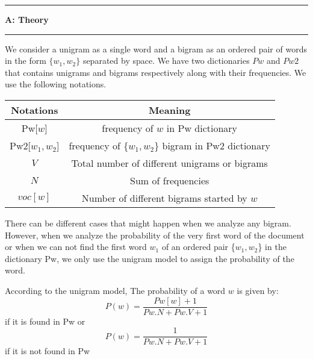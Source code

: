 \documentclass[11pt]{article}
\newcommand\question[2]{\vspace{.25in}\hrule\textbf{#1: #2}\vspace{.5em}\hrule\vspace{.10in}}
\begin{document}
\newcommand\NAME{Turash and Luiz}  %
\newcommand\ID{tmosharr \& lperesde}     %
\newcommand\HWNUM{}              %




\question{A}{Theory} 
We consider a unigram as a single word and a bigram as an ordered pair of words in the form $\{w_1,w_2\}$ separated by space.  We have two dictionaries $Pw$ and $Pw2$ that contains unigrams and bigrams respectively along with their frequencies. We use the following notations. 
\begin{table}[h]
	\vspace{-4pt}
	\centering
	\renewcommand\arraystretch{1.25}
	\begin{tabular}{|c|c|}
		\hline
		Notations   & Meaning  \\
		\hline
		Pw[$w$] & frequency of $w$ in Pw dictionary    \\
		\hline
		Pw2[$w_1,w_2$] & frequency of \{$w_1,w_2$\} bigram in Pw2 dictionary    \\
		\hline
		$V$ & Total number of different unigrams or bigrams  \\
		\hline
		$N$ & Sum of frequencies  \\
		\hline
		$voc[w]$ & Number of different bigrams started by $w$\\
		\hline
	\end{tabular}
	\vspace{-6pt}
\end{table}   



There can be different cases that might happen when we analyze any bigram. However, when we analyze the probability of the very first word of the document or when we can not find the first word $w_1$ of an ordered pair \{$w_1,w_2$\} in the dictionary Pw, we only use the unigram model to assign the probability of the word.

According to the unigram model, The probability of a word $w$ is given by:   
\begin{equation}
P(w)=\frac{Pw[w]+1}{Pw.N+Pw.V+1}
\end{equation}
if it is found in Pw or
\begin{equation}
P(w)=\frac{1}{Pw.N+Pw.V+1}
\end{equation}
if it is not found in Pw
\end{document}

